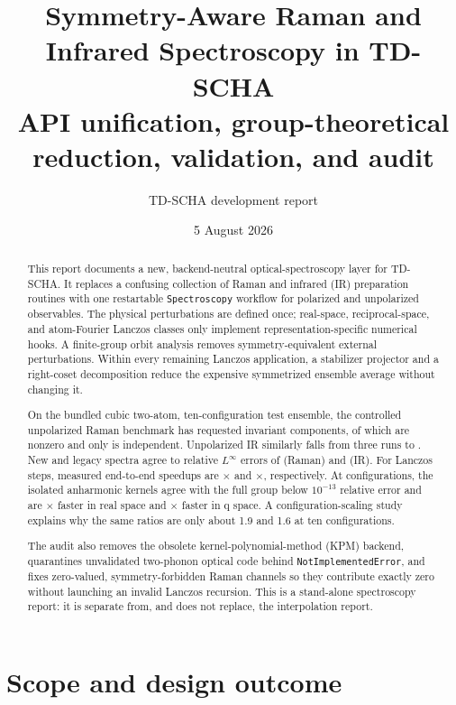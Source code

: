 \documentclass[11pt,a4paper]{article}
\title{\textbf{Symmetry-Aware Raman and Infrared Spectroscopy in TD-SCHA}\\
\large API unification, group-theoretical reduction, validation, and audit}
\author{TD-SCHA development report}
\date{5 August 2026}
\begin{document}
\maketitle

\begin{abstract}
This report documents a new, backend-neutral optical-spectroscopy layer for
TD-SCHA.  It replaces a confusing collection of Raman and infrared (IR)
preparation routines with one restartable \texttt{Spectroscopy} workflow for
polarized and unpolarized observables.  The physical perturbations are defined
once; real-space, reciprocal-space, and atom-Fourier Lanczos classes only
implement representation-specific numerical hooks.  A finite-group orbit
analysis removes symmetry-equivalent external perturbations.  Within every
remaining Lanczos application, a stabilizer projector and a right-coset
decomposition reduce the expensive symmetrized ensemble average without
changing it.

On the bundled cubic two-atom, ten-configuration test ensemble, the controlled
unpolarized Raman benchmark has \RamanRequested{} requested invariant
components, of which \RamanNonzero{} are nonzero and only
\RamanIndependent{} is independent.  Unpolarized IR similarly falls from
three runs to \IRIndependent{}.  New and legacy spectra agree to relative
$L^\infty$ errors of \RamanError{} (Raman) and \IRError{} (IR).  For
\BenchSteps{} Lanczos steps, measured end-to-end speedups are
\RamanSpeedup$\times$ and \IRSpeedup$\times$, respectively.  At
\KernelConfigurations{} configurations, the isolated anharmonic kernels
agree with the full group below $10^{-13}$ relative error and are
\RealKernelSpeedup$\times$ faster in real space and \QKernelSpeedup$\times$
faster in q space.  A configuration-scaling study explains why the same
ratios are only about 1.9 and 1.6 at ten configurations.

The audit also removes the obsolete kernel-polynomial-method (KPM) backend,
quarantines unvalidated two-phonon optical code behind
\texttt{NotImplementedError}, and fixes zero-valued, symmetry-forbidden Raman
channels so they contribute exactly zero without launching an invalid Lanczos
recursion.  This is a stand-alone spectroscopy report: it is separate from,
and does not replace, the interpolation report.
\end{abstract}

\tableofcontents
\newpage

\section{Scope and design outcome}
\end{document}
